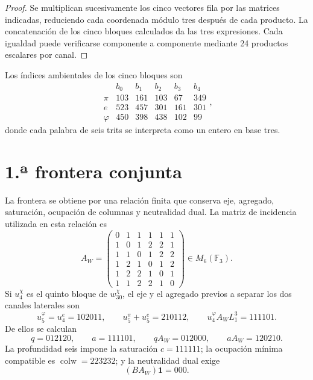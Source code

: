 \begin{proof}
Se multiplican sucesivamente los cinco vectores fila por las matrices
indicadas, reduciendo cada coordenada módulo tres después de cada producto.
La concatenación de los cinco bloques calculados da las tres expresiones.
Cada igualdad puede verificarse componente a componente mediante 24
productos escalares por canal.
\end{proof}

Los índices ambientales de los cinco bloques son
\[
\begin{array}{c|rrrrr}
&b_0&b_1&b_2&b_3&b_4\\\hline
\pi&103&161&103&67&349\\
e&523&457&301&161&301\\
\varphi&450&398&438&102&99
\end{array},
\]
donde cada palabra de seis trits se interpreta como un entero en base tres.

\section{1.ª frontera conjunta}

La frontera se obtiene por una relación finita que conserva eje, agregado,
saturación, ocupación de columnas y neutralidad dual. La matriz de incidencia
utilizada en esta relación es
\begin{equation}
 A_W=
 \begin{pmatrix}
 0&1&1&1&1&1\\
 1&0&1&2&2&1\\
 1&1&0&1&2&2\\
 1&2&1&0&1&2\\
 1&2&2&1&0&1\\
 1&1&2&2&1&0
 \end{pmatrix}\in M_6(\mathbb F_3).
 \label{eq:u008-aw-frontera}
\end{equation}
Si \(u_4^\chi\) es el quinto bloque de \(w_{30}^\chi\), el eje y el
agregado previos a separar los dos canales laterales son
\begin{equation}
 u_5^\varphi=u_4^e=102011,
 \qquad
 u_5^\pi+u_5^e=210112,
 \qquad
 u_4^\varphi A_WL_1^3=111101.
 \label{eq:u008-eje-agregado-r36}
\end{equation}
De ellos se calculan
\begin{equation}
 q=012120,\qquad a=111101,\qquad
 qA_W=012000,\qquad aA_W=120210.
 \label{eq:u008-q-a-r36}
\end{equation}
La profundidad seis impone la saturación \(c=111111\); la ocupación mínima
compatible es \(\operatorname{colw}=223232\); y la neutralidad dual exige
\begin{equation}
 (BA_W)\mathbf1=000.
 \label{eq:u008-neutralidad-dual-r36}
\end{equation}

